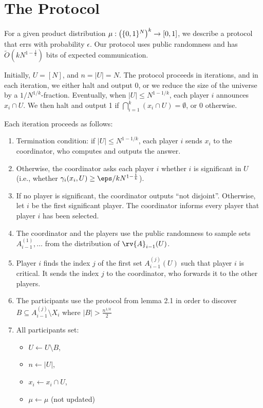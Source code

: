 \section{The Protocol}

For a given product distribution $\mu : \left(\{ 0,1 \}^N\right)^k \rightarrow [0,1]$, we describe a protocol that errs with probability $\epsilon$.
Our protocol uses public randomness and has $\tilde{O}(kN^{1-\frac{1}{k}})$ bits of expected communication.

Initially, $U = [N]$, and $n = |U| = N$.
The protocol proceeds in iterations, and in each iteration, we either halt and output 0,
or we reduce the size of the universe by a $1/N^{1/k}$-fraction.
Eventually, when $|U| \leq N^{1-1/k}$, each player $i$ announces $x_i \cap U$.
We then halt and output 1 if $\bigcap_{i = 1}^k (x_i \cap U) = \emptyset$, or 0 otherwise.

Each iteration proceeds as follows:

\begin{enumerate}[(1)]
  \item Termination condition: if $|U| \leq N^{1 - 1/k}$, each player $i$ sends $x_i$ to the coordinator, who computes and outputs the answer. 
  \item Otherwise, the coordinator asks each player $i$ whether $i$ is significant in $U$ (i.e., whether $\gamma_i(x_i, U) \geq \eps / kN^{1-\frac{1}{k}}$).
  \item If no player is significant, the coordinator outputs ``not disjoint''. Otherwise, let $i$ be the
    first significant player. The coordinator informs every player that player $i$ has been selected.
  \item The coordinator and the players use the public randomness to sample 
    sets $A_{i-1}^{(1)},\ldots$ from the distribution of $\rv{A}_{i-1}(U)$.
  \item Player $i$ finds the index $j$ of the first set $A_{i-1}^{(j)}(U)$ such that player $i$ is critical.
    It sends the index $j$ to the coordinator, who forwards it to the other players.
  \item The participants use the protocol from lemma 2.1 in order to discover $B \subseteq A_{i-1}^{(j)} \setminus X_i $ where $ |B| > \frac{n^{1/k}}{2}$ 
  \item All participants set:
    \begin{itemize}
      \item $U \leftarrow U \setminus B$,
      \item $n \leftarrow |U|$,
      \item $x_i \leftarrow x_i \cap U$,
      \item $\mu \leftarrow \mu $ (not updated)
    \end{itemize}
\end{enumerate}